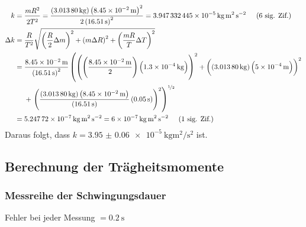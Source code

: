             \begin{align}
                k &= \frac{mR^2}{\rule{0pt}{1em}2T^2} = \frac{\left(\SI{3.01380}{\kilo\gram}\right)\left(\SI{8.45e-2}{\meter}\right)^2}{2\left(\SI{16.51}{\second}\right)^2} = \SI{3.947332445e-5}{\kilo\gram\meter\squared\per\second\squared} \sigfig{6} \\
                \Delta k &= \frac{R}{T^2}\sqrt{\left(\frac{R}{2}\Delta m\right)^2 + \left(m\Delta R\right)^2 + \left(\frac{mR}{T}\Delta T\right)^2} \notag \\
                &= \frac{\SI{8.45e-2}{\meter}}{\left(\SI{16.51}{\second}\right)^2}\left(\left(\left(\frac{\SI{8.45e-2}{\meter}}{2}\right)\left(\SI{1.3e-4}{\kilo\gram}\right)\right)^2 + \left(\left(\SI{3.01380}{\kilo\gram}\right)\left(\SI{5e-4}{\meter}\right)\right)^2 \right. \notag \\
                &~~~~+ \left. \left(\frac{\left(\SI{3.01380}{\kilo\gram}\right)\left(\SI{8.45e-2}{\meter}\right)}{\left(\SI{16.51}{\second}\right)}\left(\SI{0.05}{\second}\right)\right)^2\right)^{\nicefrac{1}{2}} \notag \\
                &= \SI{5.24772e-7}{\kilo\gram\meter\squared\per\second\squared} = \SI{6e-7}{\kilo\gram\meter\squared\per\second\squared} \sigfig{1}
            \end{align}
            Daraus folgt, dass $k = \SI{3.95(6)e-5}{\kilo\gram\meter\squared\per\second\squared}$ ist.

    \subsection{Berechnung der Trägheitsmomente}
        \subsubsection{Messreihe der Schwingungsdauer}
            Fehler bei jeder Messung $= \SI{0.2}{\second}$

